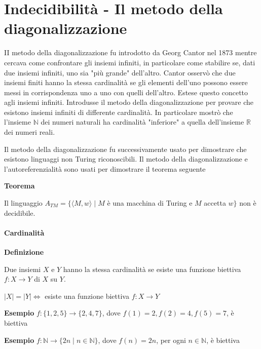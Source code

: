 \chapter{Indecidibilità - Il metodo della
diagonalizzazione}

II metodo della diagonalizzazione fu introdotto da Georg Cantor nel 1873 mentre cercava come confrontare gli insiemi infiniti, in particolare come stabilire se, dati due insiemi infiniti, uno sia "più grande" dell'altro.
Cantor osservò che due insiemi finiti hanno la stessa cardinalità se gli elementi dell'uno possono essere messi in corrispondenza uno a uno con quelli dell'altro.
Estese questo concetto agli insiemi infiniti.
Introdusse il metodo della diagonalizzazione per provare che esistono insiemi infiniti di differente cardinalità.
In particolare mostrò che l'insieme $\mathbb{N}$ dei numeri naturali ha cardinalità "inferiore" a quella dell'insieme $\mathbb{R}$ dei numeri reali.

\vspace{5mm}

Il metodo della diagonalizzazione fu successivamente usato per dimostrare che esistono linguaggi non Turing riconoscibili. Il metodo della diagonalizzazione e l'autoreferenzialità sono usati per dimostrare il teorema seguente

\vspace{5mm}

\textbf{Teorema}

Il linguaggio
$A_{T M}=\{\langle M, w\rangle \mid M$ è una macchina di Turing e $M$ accetta $w\}$ non è decidibile.

\subsubsection{Cardinalità}

\textbf{Definizione}

Due insiemi $X$ e $Y$ hanno la stessa cardinalità se esiste una funzione biettiva $f: X \rightarrow Y$ di $X$ su $Y$.

$|X|=|Y| \Leftrightarrow$ esiste una funzione biettiva $f: X \rightarrow Y$

\vspace{5mm}


\textbf{Esempio} $f:\{1,2,5\} \rightarrow\{2,4,7\}$,
dove $f(1)=2, f(2)=4, f(5)=7$, è biettiva

\textbf{Esempio} $f: \mathbb{N} \rightarrow\{2 n \mid n \in \mathbb{N}\}$,
dove $f(n)=2 n$, per ogni $n \in \mathbb{N}$, è biettiva

